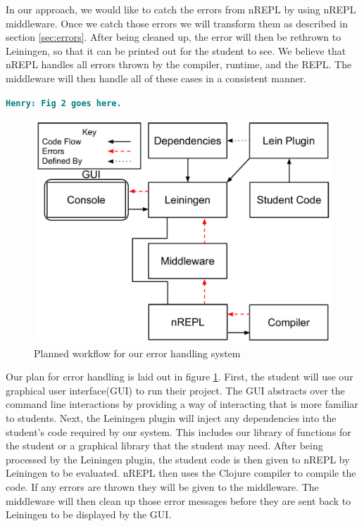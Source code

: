 \documentclass[12pt]{article}
\newcommand{\comment}[1]{{\bf \tt  {#1}}}
\newcommand{\emcomment}[1]{\textcolor{ForestGreen}{\comment{Elena: {#1}}}}
\newcommand{\hfcomment}[1]{\textcolor{Teal}{\comment{Henry: {#1}}}}
\begin{document}
In our approach, we would like to catch the errors from nREPL by using nREPL middleware. 
Once we catch those errors we will transform them as described in section 
\ref{sec:errors}. After being cleaned up, the error will then be rethrown to Leiningen, 
so that it can be printed out for the student to see. We believe that nREPL handles all 
errors thrown by the compiler, runtime, and the REPL. The middleware will then handle 
all of these cases in a consistent manner.

\hfcomment{Fig 2 goes here.}
\begin{figure}[h]
 \includegraphics[width=12cm]{OurErrorHandlingSystem.pdf}
 \centering
  \caption{Planned workflow for our error handling system}
 \label{fig:OurSystem}
\end{figure}

Our plan for error handling is laid out in figure \ref{fig:OurSystem}. First, the 
student will use our graphical user interface(GUI) to run their project. The GUI 
abstracts over the command line interactions by providing a way of interacting that is 
more familiar to students. Next, the Leiningen plugin will inject any dependencies into 
the student's code required by our system. This includes our library of functions for 
the student or a graphical library that the student may need. After being processed by 
the Leiningen plugin, the student code is then given to nREPL by Leiningen to be 
evaluated. nREPL then uses the Clojure compiler to compile the code. If any errors are 
thrown they will be given to the middleware. The middleware will then clean up those 
error messages before they are sent back to Leiningen to be displayed by the GUI.
\end{document}
